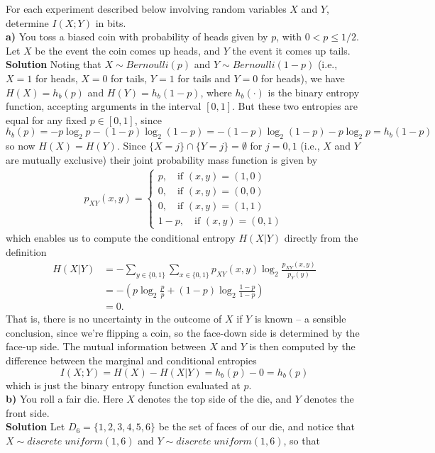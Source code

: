\documentclass[11pt, letterpaper]{article}
\begin{document}
 For each experiment described below involving random variables $X$ and $Y$, determine $I(X;Y)$ in bits.\\[10pt]
{\bf a)} You toss a biased coin with probability of heads given by $p$, with $0<p\leq 1/2$. Let $X$ be the event the coin comes up heads, and $Y$
the event it comes up tails.\\[10pt]
{\bf Solution} Noting that $X\sim Bernoulli(p)$ and $Y\sim Bernoulli(1-p)$ (i.e., $X=1$ for heads, $X=0$ for tails, $Y=1$ for tails and $Y=0$ for heads), we have $H(X)=h_b(p)$ and $H(Y)=h_b(1-p)$, where $h_b(\cdot)$ is the binary
entropy function, accepting arguments in the interval $[0,1]$. But these two entropies are equal for any fixed $p\in[0,1]$, since
\[h_b(p)=-p\log_2p-(1-p)\log_2(1-p)=-(1-p)\log_2(1-p)-p\log_2p=h_b(1-p)\]
so now $H(X)=H(Y)$. Since $\{X=j\}\cap\{Y=j\}=\emptyset$ for $j=0,1$ (i.e., $X$ and $Y$ are mutually exclusive) their joint probability mass function is given by
\begin{align*}
    p_{XY}(x,y)=\begin{cases}
        p,\quad\text{if $(x,y)=(1,0)$}\\
        0,\quad\text{if $(x,y)=(0,0)$}\\
        0,\quad\text{if $(x,y)=(1,1)$}\\
        1-p,\quad\text{if $(x,y)=(0,1)$}
    \end{cases}
\end{align*}
which enables us to compute the conditional entropy $H(X|Y)$ directly from the definition
\begin{align*}
    H(X|Y)&=-\sum_{y\in\{0,1\}}\sum_{x\in\{0,1\}}p_{XY}(x,y)\log_2\frac{p_{XY}(x,y)}{p_Y(y)}\\
    &=-\left(p\log_2\frac{p}{p}+(1-p)\log_2\frac{1-p}{1-p}\right)\\
    &=0.
\end{align*}
That is, there is no uncertainty in the outcome of $X$ if $Y$ is known -- a sensible conclusion, since we're flipping a coin, so the face-down side is determined by the face-up side. The mutual information between $X$ and $Y$
is then computed by the difference between the marginal and conditional entropies
\[I(X;Y)=H(X)-H(X|Y)=h_b(p)-0=h_b(p)\]
which is just the binary entropy function evaluated at $p$.\\[10pt]
{\bf b)} You roll a fair die. Here $X$ denotes the top side of the die, and $Y$ denotes the front side.\\[10pt]
{\bf Solution} Let $D_6=\{1,2,3,4,5,6\}$ be the set of faces of our die, and notice that $X\sim discrete\;uniform(1,6)$ and $Y\sim discrete\;uniform(1,6)$, so that
\end{document}
